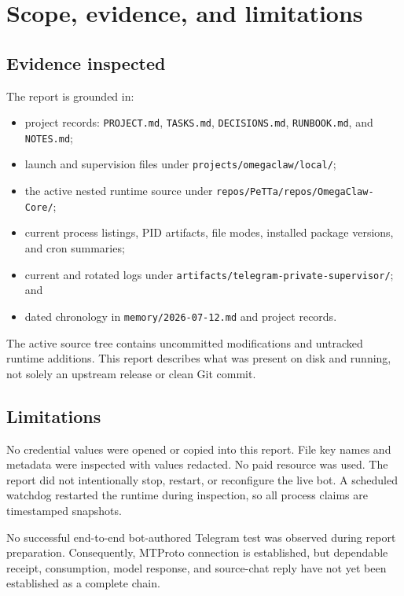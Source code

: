 \documentclass[10pt]{article}
\newcommand{\code}[1]{\texttt{#1}}
\begin{document}
\section{Scope, evidence, and limitations}

\subsection{Evidence inspected}

The report is grounded in:
\begin{itemize}
  \item project records: \code{PROJECT.md}, \code{TASKS.md}, \code{DECISIONS.md}, \code{RUNBOOK.md}, and \code{NOTES.md};
  \item launch and supervision files under \code{projects/omegaclaw/local/};
  \item the active nested runtime source under \code{repos/PeTTa/repos/OmegaClaw-Core/};
  \item current process listings, PID artifacts, file modes, installed package versions, and cron summaries;
  \item current and rotated logs under \code{artifacts/telegram-private-supervisor/}; and
  \item dated chronology in \code{memory/2026-07-12.md} and project records.
\end{itemize}

The active source tree contains uncommitted modifications and untracked runtime additions. This report describes what was present on disk and running, not solely an upstream release or clean Git commit.

\subsection{Limitations}

No credential values were opened or copied into this report. File key names and metadata were inspected with values redacted. No paid resource was used. The report did not intentionally stop, restart, or reconfigure the live bot. A scheduled watchdog restarted the runtime during inspection, so all process claims are timestamped snapshots.

No successful end-to-end bot-authored Telegram test was observed during report preparation. Consequently, MTProto connection is established, but dependable receipt, consumption, model response, and source-chat reply have not yet been established as a complete chain.
\end{document}
